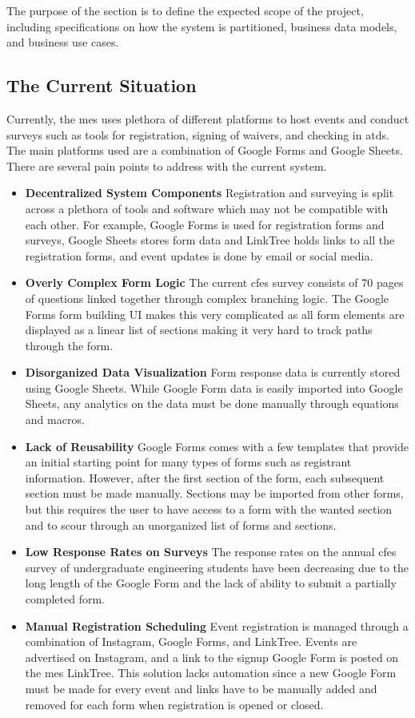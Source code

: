 \documentclass[12pt]{article}
\begin{document}
The purpose of the section is to define the expected scope of the project, including specifications on how the system is
partitioned, business data models, and business use cases.

\subsection{The Current Situation}

Currently, the \gls{mes} uses plethora of different platforms to host events and conduct surveys such as tools for
registration, signing of waivers, and checking in \glspl{atd}. The main platforms used are a combination of Google Forms
and Google Sheets. There are several pain points to address with the current system.

\begin{itemize}
  \item \textbf{Decentralized System Components} Registration and surveying is split across a plethora of tools and
    software which may not be compatible with each other. For example, Google Forms is used for registration forms and
    surveys, Google Sheets stores form data and LinkTree holds links to all the registration forms, and event updates is
    done by email or social media.
  \item \textbf{Overly Complex Form Logic} The current \gls{cfes} survey consists of 70 pages of questions linked
    together through complex branching logic. The Google Forms form building UI makes this very complicated as all form
    elements are displayed as a linear list of sections making it very hard to track paths through the form.
  \item \textbf{Disorganized Data Visualization} Form response data is currently stored using Google Sheets. While
    Google Form data is easily imported into Google Sheets, any analytics on the data must be done manually through
    equations and macros.
  \item \textbf{Lack of Reusability} Google Forms comes with a few templates that provide an initial starting point for
    many types of forms such as registrant information. However, after the first section of the form, each subsequent
    section must be made manually. Sections may be imported from other forms, but this requires the user to have access
    to a form with the wanted section and to scour through an unorganized list of forms and sections.
  \item \textbf{Low Response Rates on Surveys} The response rates on the annual \gls{cfes} survey of undergraduate engineering
    students have been decreasing due to the long length of the Google Form and the lack of ability to submit a
    partially completed form.
  \item \textbf{Manual Registration Scheduling} Event registration is managed through a combination of Instagram, Google
    Forms, and LinkTree. Events are advertised on Instagram, and a link to the signup Google Form is posted on the
    \gls{mes} LinkTree. This solution lacks automation since a new Google Form must be made for every event and links
    have to be manually added and removed for each form when registration is opened or closed.
\end{itemize}
\end{document}
